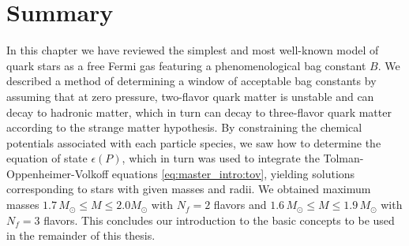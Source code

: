 \section{Summary}

In this chapter we have reviewed the simplest and most well-known model of quark stars
as a free Fermi gas featuring a phenomenological bag constant $B$.
We described a method of determining a window of acceptable bag constants by assuming that at zero pressure,
two-flavor quark matter is unstable and can decay to hadronic matter,
which in turn can decay to three-flavor quark matter according to the strange matter hypothesis.
By constraining the chemical potentials associated with each particle species,
we saw how to determine the equation of state $\epsilon(P)$,
which in turn was used to integrate the Tolman-Oppenheimer-Volkoff equations \eqref{eq:master_intro:tov},
yielding solutions corresponding to stars with given masses and radii.
We obtained maximum masses $1.7 \, M_\odot \leq M \leq 2.0 M_\odot$ with $N_f=2$ flavors
and $1.6 \, M_\odot \leq M \leq 1.9 \, M_\odot$ with $N_f=3$ flavors.
This concludes our introduction to the basic concepts to be used in the remainder of this thesis.
